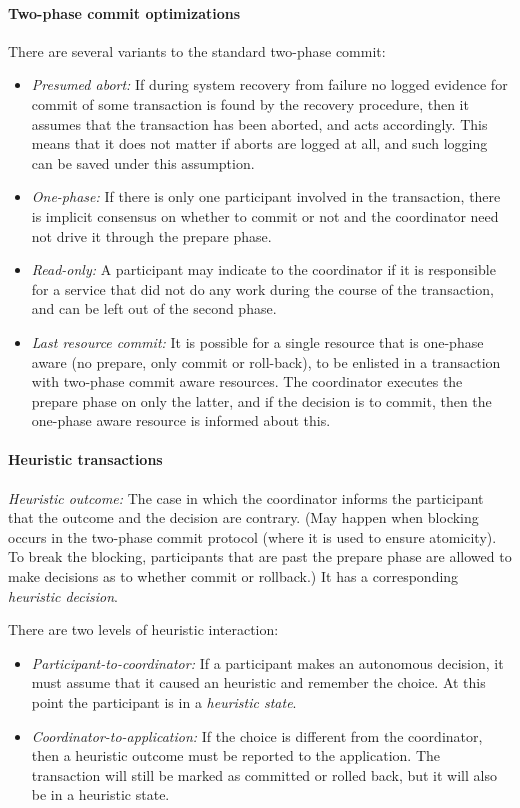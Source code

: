 \paragraph{Two-phase commit optimizations} There are several variants to the standard two-phase commit:
\begin{itemize}[nolistsep,noitemsep]
  \item \textit{Presumed abort:} If during system recovery from failure no logged evidence for commit of some transaction is found by the recovery procedure, then it assumes that the transaction has been aborted, and acts accordingly. This means that it does not matter if aborts are logged at all, and such logging can be saved under this assumption.
  \item \textit{One-phase:} If there is only one participant involved in the transaction, there is implicit consensus on whether to commit or not and the coordinator need not drive it through the prepare phase.
  \item \textit{Read-only:}  A participant may indicate to the coordinator if it is responsible for a service that did not do any work during the course of the transaction, and can be left out of the second phase.
  \item \textit{Last resource commit:} It is possible for a single resource that is one-phase aware (no prepare, only commit or roll-back), to be enlisted in a transaction with two-phase commit aware resources. The coordinator executes the prepare phase on only the latter, and if the decision is to commit, then the one-phase aware resource is informed about this.
\end{itemize}

\paragraph{Heuristic transactions}

\textit{Heuristic outcome:} The case in which the coordinator informs the participant that the outcome and the decision are contrary. (May happen when blocking occurs in the two-phase commit protocol (where it is used to ensure atomicity). To break the blocking, participants that are past the prepare phase are allowed to make decisions as to whether commit or rollback.) It has a corresponding \textit{heuristic decision}.

There are two levels of heuristic interaction:
\begin{itemize}[nolistsep,noitemsep]
  \item \textit{Participant-to-coordinator:} If a participant makes an autonomous decision, it must assume that it caused an heuristic and remember the choice. At this point the participant is in a \textit{heuristic state}.
  \item \textit{Coordinator-to-application:} If the choice is different from the coordinator, then a heuristic outcome must be reported to the application. The transaction will still be marked as committed or rolled back, but it will also be in a heuristic state.
\end{itemize}

